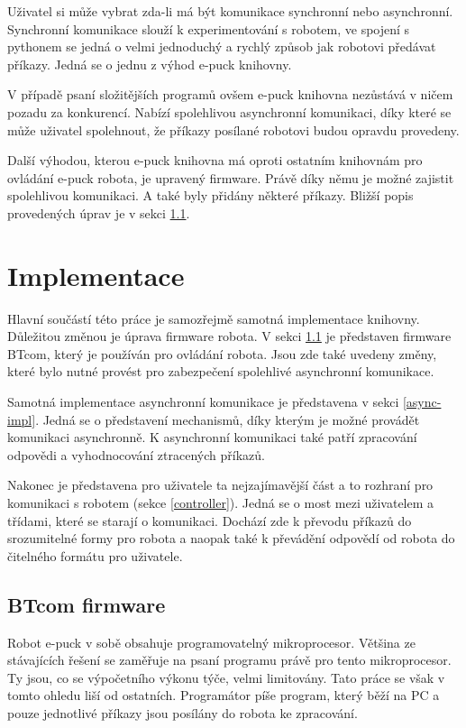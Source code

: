 \documentclass[12pt,notitlepage]{report}
\begin{document}
    Uživatel si může vybrat zda-li má být komunikace synchronní nebo
    asynchronní. Synchronní komunikace slouží k experimentování s robotem, ve
    spojení s pythonem se jedná o velmi jednoduchý a rychlý způsob jak robotovi
    předávat příkazy. Jedná se o jednu z výhod e-puck knihovny.

    V případě psaní složitějších programů ovšem e-puck knihovna nezůstává v
    ničem pozadu za konkurencí. Nabízí spolehlivou asynchronní komunikaci, díky
    které se může uživatel spolehnout, že příkazy posílané robotovi budou
    opravdu provedeny.

    Další výhodou, kterou e-puck knihovna má oproti ostatním knihovnám pro
    ovládání e-puck robota, je upravený firmware. Právě díky němu je možné
    zajistit spolehlivou komunikaci. A také byly přidány některé příkazy.
    Bližší popis provedených úprav je v sekci \ref{btcom}.

\chapter{Implementace}

    Hlavní součástí této práce je samozřejmě samotná implementace knihovny.
    Důležitou změnou je úprava firmware robota. V sekci \ref{btcom} je
    představen firmware BTcom, který je používán pro ovládání robota. Jsou zde
    také uvedeny změny, které bylo nutné provést pro zabezpečení spolehlivé
    asynchronní komunikace.

    Samotná implementace asynchronní komunikace je představena v sekci
    \ref{async-impl}. Jedná se o představení mechanismů, díky kterým je možné
    provádět komunikaci asynchronně. K asynchronní komunikaci také patří
    zpracování odpovědi a vyhodnocování ztracených příkazů.

    Nakonec je představena pro uživatele ta nejzajímavější část a to rozhraní
    pro komunikaci s robotem (sekce \ref{controller}). Jedná se o most mezi
    uživatelem a třídami, které se starají o komunikaci. Dochází zde k převodu
    příkazů do srozumitelné formy pro robota a naopak také k převádění odpovědí
    od robota do čitelného formátu pro uživatele.

    \section{BTcom firmware}
    \label{btcom}

    Robot e-puck v sobě obsahuje programovatelný mikroprocesor. Většina ze
    stávajících řešení se zaměřuje na psaní programu právě pro tento
    mikroprocesor. Ty jsou, co se výpočetního výkonu týče, velmi limitovány.
    Tato práce se však v tomto ohledu liší od ostatních. Programátor píše
    program, který běží na PC a pouze jednotlivé příkazy jsou posílány do
    robota ke zpracování.
\end{document}
